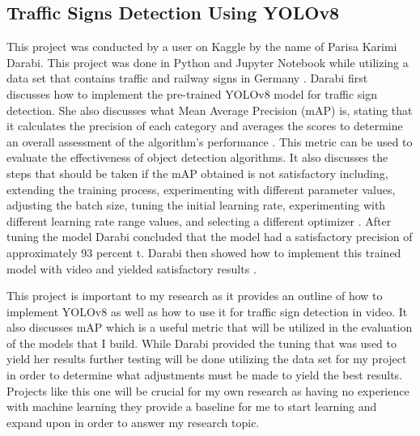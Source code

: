\documentclass[10pt,twocolumn]{article}
\begin{document}
\subsection{Traffic Signs Detection Using YOLOv8}
This project was conducted by a user on Kaggle by the name of Parisa Karimi Darabi. This project was done in Python and Jupyter Notebook while utilizing a data set that contains traffic and railway signs in Germany \textcite{Darabi}. Darabi first discusses how to implement the pre-trained YOLOv8 model for traffic sign detection. She also discusses what Mean Average Precision (mAP) is, stating that it calculates the precision of each category and averages the scores to determine an overall assessment of the algorithm's performance \textcite{Darabi}. This metric can be used to evaluate the effectiveness of object detection algorithms. It also discusses the steps that should be taken if the mAP obtained is not satisfactory including, extending the training process, experimenting with different parameter values, adjusting the batch size, tuning the initial learning rate, experimenting with different learning rate range values, and selecting a different optimizer \textcite{Darabi}. After tuning the model Darabi concluded that the model had a satisfactory precision of approximately 93 percent \textcite{Darabi}t. Darabi then showed how to implement this trained model with video and yielded satisfactory results \textcite{Darabi}. 

This project is important to my research as it provides an outline of how to implement YOLOv8 as well as how to use it for traffic sign detection in video. It also discusses mAP which is a useful metric that will be utilized in the evaluation of the models that I build. While Darabi provided the tuning that was used to yield her results further testing will be done utilizing the data set for my project in order to determine what adjustments must be made to yield the best results. Projects like this one will be crucial for my own research as having no experience with machine learning they provide a baseline for me to start learning and expand upon in order to answer my research topic. 
\end{document}
